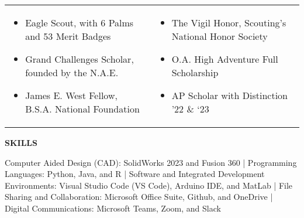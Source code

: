 \documentclass[18pt]{article}
\begin{document}
    \begin{tabular}{p{}p{}}

        \begin{itemize}[noitemsep]
            \vspace{-\baselineskip}
            \item \hspace{-0.1in} Eagle Scout, with 6 Palms and 53 Merit Badges
            \item \hspace{-0.1in} Grand Challenges Scholar, founded by the N.A.E. 
            \item \hspace{-0.1in} James E. West Fellow, B.S.A. National Foundation
            \vspace{-\baselineskip}
        \end{itemize}
        &
        \begin{itemize}[noitemsep]
            \vspace{-\baselineskip}
            \item The Vigil Honor, Scouting’s National Honor Society 
            \item O.A. High Adventure Full Scholarship
            \item AP Scholar with Distinction ’22 \& ‘23 
            \vspace{-\baselineskip}
        \end{itemize}\\

    \end{tabular}


    \begin{center}
        \vspace{-0.5\baselineskip}
        \textbf{SKILLS}
        \hrulefill
    \end{center}
    \vspace{-1.25\baselineskip}


    \justify Computer Aided Design (CAD): SolidWorks 2023 and Fusion 360 | Programming Languages: Python, Java, and R | Software and Integrated Development Environments: Visual Studio Code (VS Code), Arduino IDE, and MatLab | File Sharing and Collaboration: Microsoft Office Suite, Github, and OneDrive | Digital Communications: Microsoft Teams, Zoom, and Slack
\end{document}
